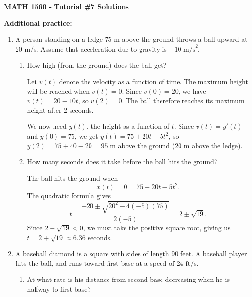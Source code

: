 \documentclass[12pt]{article}
\begin{document}
\author{Instructor: Sean Fitzpatrick}
\thispagestyle{empty}
\begin{center}
{\bf MATH 1560 - Tutorial \#7 Solutions}
\end{center}

\textbf{Additional practice:}
\begin{enumerate}
\item A person standing on a ledge $75$ m above the ground throws a ball upward at $20$ m/s. Assume that acceleration due to gravity is $-10\text{ m/s}^2$.
\begin{enumerate}
\item How high (from the ground) does the ball get?

\medskip

Let $v(t)$ denote the velocity as a function of time. The maximum height will be reached when $v(t)=0$. Since $v(0)=20$, we have $v(t) = 20-10t$, so $v(2)=0$. The ball therefore reaches its maximum height after 2 seconds.

We now need $y(t)$, the height as a function of $t$. Since $v(t)=y'(t)$ and $y(0)=75$, we get $y(t)=75+20t-5t^2$, so $y(2)=75+40-20=95$ m above the ground (20 m above the ledge).

\item How many seconds does it take before the ball hits the ground?

The ball hits the ground when
\[
x(t) = 0 = 75+20t-5t^2.
\]
The quadratic formula gives
\[
t = \frac{-20\pm \sqrt{20^2-4(-5)(75)}}{2(-5)} = 2\pm\sqrt{19}.
\]
Since $2-\sqrt{19}<0$, we must take the positive square root, giving us $t=2+\sqrt{19}\approx 6.36$ seconds. 
\end{enumerate}
\item A baseball diamond is a square with sides of length 90 feet. A baseball player hits the ball, and runs toward first base at a speed of 24 ft/s. 
\begin{enumerate}
\item At what rate is his distance from second base decreasing when he is halfway to first base?


\end{enumerate}
\end{enumerate}
\end{document}
